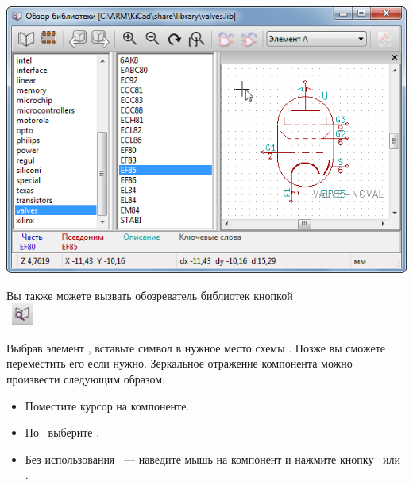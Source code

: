 \begin{itemize}
\begin{enumerate}
\includegraphics[height=0.5\textheight]{kicad/ee19.png}

  \end{enumerate} 
\end{itemize}

Вы также можете
вызвать обозреватель библиотек кнопкой\\
\ \includegraphics[height=2em]{kicad/ee20.png}

Выбрав элемент \dblms, вставьте символ в нужное место схемы \lms.
Позже вы сможете переместить его если нужно.
Зеркальное отражение компонента можно произвести следующим образом:

\begin{itemize}
  \item Поместите курсор на компоненте.
  \item По \rms\ выберите . 
  \item Без использования \ --- наведите мышь на
  компонент и нажмите кнопку \ или .
\end{itemize}

\secup


